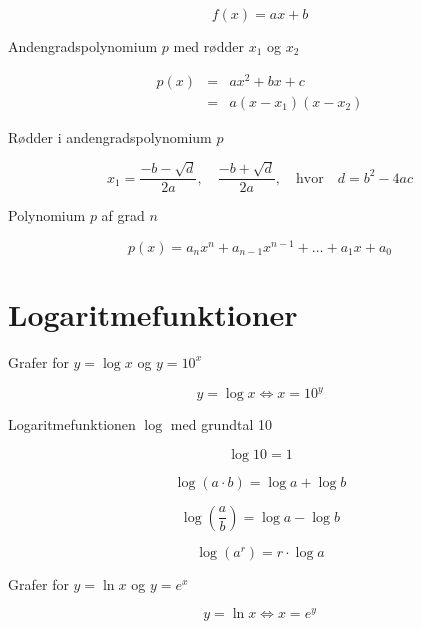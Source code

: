 \documentclass[11pt,a4paper,landscape,twocolumn,fleqn,leqno]{article}
\begin{document}
\begin{equation}
f(x) = ax+b
\end{equation}

Andengradspolynomium $p$ med rødder $x_1$ og $x_2$

\begin{eqnarray}
p(x) & = & ax^2 + bx + c \\
 & = & a(x-x_1)(x-x_2) \nonumber
\end{eqnarray}

Rødder i andengradspolynomium $p$

\begin{equation}
x_1 = \frac{-b - \sqrt{d}}{2a}, \quad \frac{-b + \sqrt{d}}{2a}, \quad \text{hvor} \quad d = b^2 - 4ac
\end{equation}

Polynomium $p$ af grad $n$

\begin{equation}
p(x) = a_nx^n + a_{n-1}x^{n-1} + \dots + a_1x + a_0
\end{equation}

\vfill

\section{Logaritmefunktioner}

Grafer for $y = \log x$ og $y = 10^x$

\begin{equation}
y = \log x \Leftrightarrow x = 10^y
\end{equation}

Logaritmefunktionen $\log$ med grundtal 10

\begin{equation}
\log 10 = 1
\end{equation}

\begin{equation}
\log(a \cdot b) = \log a + \log b
\end{equation}

\begin{equation}
\log\left(\frac{a}{b}\right) = \log a - \log b
\end{equation}

\begin{equation}
\log(a^r) = r \cdot \log a
\end{equation}

Grafer for $y = \ln x$ og $y = e^x$

\begin{equation}
y = \ln x \Leftrightarrow x = e^y
\end{equation}
\end{document}
